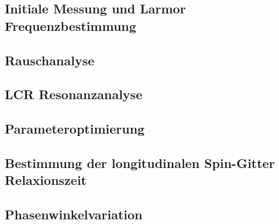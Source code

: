 \documentclass{article}
\begin{document}
    \subsection{Initiale Messung und Larmor Frequenzbestimmung}\label{subsec:2:InitialeMessung}
        

    \subsection{Rauschanalyse}\label{subsec:3:Rauschanalyse}
        

    \subsection{LCR Resonanzanalyse}\label{subsec:4:LCRResonanzanalyse}
        

    \subsection{Parameteroptimierung}\label{subsec:5:Parameteroptimierung}
        

    \subsection{Bestimmung der longitudinalen Spin-Gitter Relaxionszeit}\label{subsec:8:BestimmungDerLongitudinalenSpinGitterRelaxionszeit}
        

    \subsection{Phasenwinkelvariation}
        

    
\end{document}
